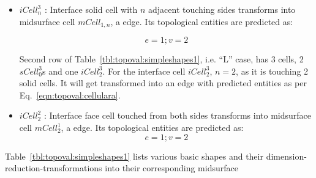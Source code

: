 \begin{itemize}
	\item $iCell^{3}_{n}$ : Interface solid cell with $n$ adjacent touching sides transforms into midsurface cell  $mCell_{1,n}$, a edge. Its topological entities are predicted as:

\begin{equation}
e=1;
v=2
\label{eqn:topoval:cellulara}
\end{equation}

Second row of Table~\ref{tbl:topoval:simpleshapes1}, i.e. ``L'' case, has 3 cells, 2 $sCell^{3}_{0}$s and one $ iCell^{3}_{2}$. For the interface cell $ iCell^{3}_{2}$, $n=2$, as it is touching 2 solid cells. It will get transformed into an edge with predicted entities as per Eq.~\ref{eqn:topoval:cellulara}.

	\item  $iCell^{2}_{2}$ :	Interface face cell touched from both sides  transforms into midsurface cell  $mCell^{1}_{2}$, a edge. Its topological entities are predicted as:
\begin{equation}
e=1;
v=2
\label{eqn:topoval:cellularaf}
\end{equation}


\end{itemize}


Table~\ref{tbl:topoval:simpleshapes1} lists various basic shapes and their dimension-reduction-transformations into their corresponding midsurface



